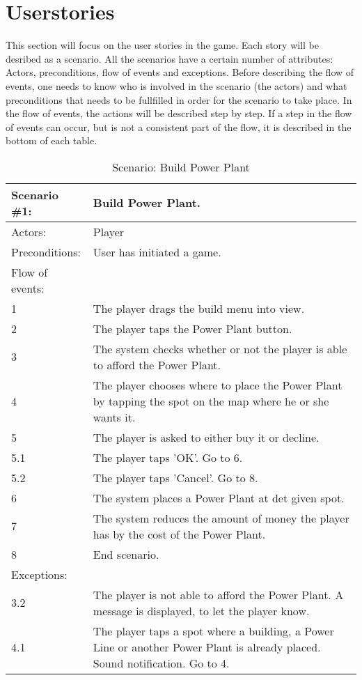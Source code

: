 \section{Userstories}

This section will focus on the user stories in the game. Each story will be desribed as a scenario. All the scenarios have a certain number of attributes: Actors, preconditions, flow of events and exceptions. Before describing the flow of events, one needs to know who is involved in the scenario (the actors) and what preconditions that needs to be fullfilled in order for the scenario to take place. In the flow of events, the actions will be described step by step. If a step in the flow of events can occur, but is not a consistent part of the flow, it is described in the bottom of each table.\\


\begin{table}[H]
	\begin{tabular}{| l | p{10cm} |}
		\hline
		\rowcolor{lightgray}
		{\bf Scenario \#1:} & {\bf Build Power Plant.} \\ \hline
		Actors: & Player \\ \hline
		Preconditions: & User has initiated a game. \\ \hline
		\rowcolor{lightergray}
		Flow of events: &  \\ \hline
		1 & The player drags the build menu into view. \\ \hline
		2 & The player taps the Power Plant button. \\ \hline
		3 & The system checks whether or not the player is able to afford the Power Plant. \\ \hline
		4 & The player chooses where to place the Power Plant by tapping the spot on the map where he or she wants it. \\ \hline
		5 & The player is asked to either buy it or decline. \\ \hline
		5.1 & The player taps 'OK'. Go to 6. \\ \hline
		5.2 & The player taps 'Cancel'. Go to 8. \\ \hline
		6 & The system places a Power Plant at det given spot. \\ \hline
		7 & The system reduces the amount of money the player has by the cost of the Power Plant. \\ \hline
		8 & End scenario. \\ \hline
		\rowcolor{lightergray}
		Exceptions: & \\ \hline
		3.2 & The player is not able to afford the Power Plant. A message is displayed, to let the player know. \\ \hline
		4.1 & The player taps a spot where a building, a Power Line or another Power Plant is already placed. Sound notification. Go to 4. \\ \hline
	\end{tabular}
\caption{Scenario: Build Power Plant}
\end{table}

